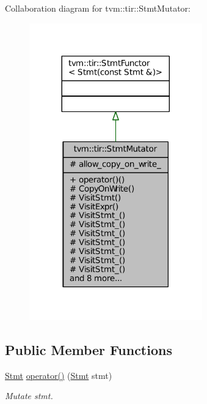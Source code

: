 Collaboration diagram for tvm\+:\+:tir\+:\+:Stmt\+Mutator\+:
\nopagebreak
\begin{figure}[H]
\begin{center}
\leavevmode
\includegraphics[width=212pt]{classtvm_1_1tir_1_1StmtMutator__coll__graph}
\end{center}
\end{figure}
\subsection*{Public Member Functions}
\begin{DoxyCompactItemize}
\item 
\hyperlink{classtvm_1_1tir_1_1Stmt}{Stmt} \hyperlink{classtvm_1_1tir_1_1StmtMutator_a18e378023df3122893ffaf50bb89464e}{operator()} (\hyperlink{classtvm_1_1tir_1_1Stmt}{Stmt} stmt)
\begin{DoxyCompactList}\small\item\em Mutate stmt. \end{DoxyCompactList}\end{DoxyCompactItemize}
